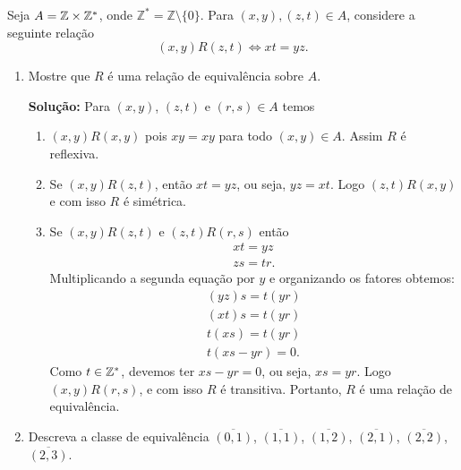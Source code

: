 \documentclass[12pt]{article}
\begin{document}
\questao Seja $A=\mathbb{Z}\times \mathbb{Z}^*$, onde $\mathbb{Z}^*=\mathbb{Z}\setminus \{0\}$. Para $(x,y), (z,t) \in
A$, considere a seguinte rela{\c c}{\~a}o
\[
(x,y)R(z,t) \Leftrightarrow xt = yz.
\]
\begin{enumerate}[label={\alph*})]
\item Mostre que $R$ {\'e} uma rela{\c c}{\~a}o de equival{\^e}ncia sobre $A$.

\noindent\textbf{Solu\c{c}\~ao:} Para $(x,y)$, $(z,t)$ e $(r,s) \in A$ temos
\begin{enumerate}
	\item $(x,y)R(x,y)$ pois $xy = xy$ para todo $(x,y) \in A$. Assim $R$ \'e reflexiva.
	\item Se $(x,y)R(z,t)$, ent\~ao $xt = yz$, ou seja, $yz = xt$. Logo $(z,t)R(x,y)$ e com isso $R$ \'e sim\'etrica.
	\item Se $(x,y)R(z,t)$ e $(z,t)R(r,s)$ ent\~ao
	\begin{align}
		xt = yz\\
		zs = tr.
	\end{align}
	Multiplicando a segunda equa\c{c}\~ao por $y$ e organizando os fatores obtemos:
	\begin{align*}
		(yz)s = t(yr)\\
		(xt)s = t(yr)\\
		t(xs) = t(yr)\\
		t(xs - yr) = 0.
	\end{align*}
	Como $t \in \mathbb{Z}^*$, devemos ter $xs - yr = 0$, ou seja, $xs = yr$. Logo $(x,y)R(r,s)$, e com isso $R$ \'e transitiva.
	Portanto, $R$ \'e uma rela\c{c}\~ao de equival\^encia.
\end{enumerate}

\item Descreva a classe de equival{\^e}ncia $\overline{(0,1)}$, $\overline{(1,1)}$, $\overline{(1,2)}$, $\overline{(2,1)}$, $\overline{(2,2)}$, $\overline{(2,3)}$.


\end{enumerate}
\end{document}
